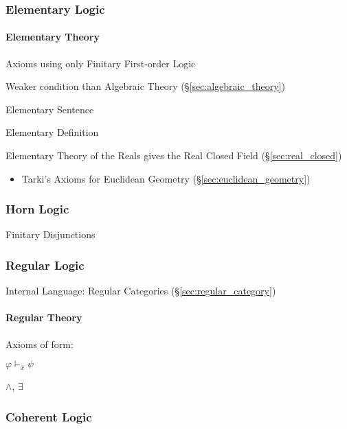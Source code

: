 \subsubsection{Elementary Logic}\label{sec:elementary_logic}

\paragraph{Elementary Theory}\label{sec:elementary_theory}\hfill

Axioms using only Finitary First-order Logic %

Weaker condition than Algebraic Theory (\S\ref{sec:algebraic_theory})

Elementary Sentence

Elementary Definition

Elementary Theory of the Reals gives the Real Closed Field
(\S\ref{sec:real_closed})

\begin{itemize}
  \item Tarki's Axioms for Euclidean Geometry (\S\ref{sec:euclidean_geometry})
\end{itemize}



\subsubsection{Horn Logic}\label{sec:horn_logic}

Finitary Disjunctions



\subsubsection{Regular Logic}\label{sec:regular_logic}

Internal Language: Regular Categories (\S\ref{sec:regular_category})



\paragraph{Regular Theory}\label{sec:regular_theory}\hfill

Axioms of form:

$\varphi \vdash_{\overline{x}} \psi$

$\wedge$, $\exists$



\subsubsection{Coherent Logic}\label{sec:coherent_logic}

